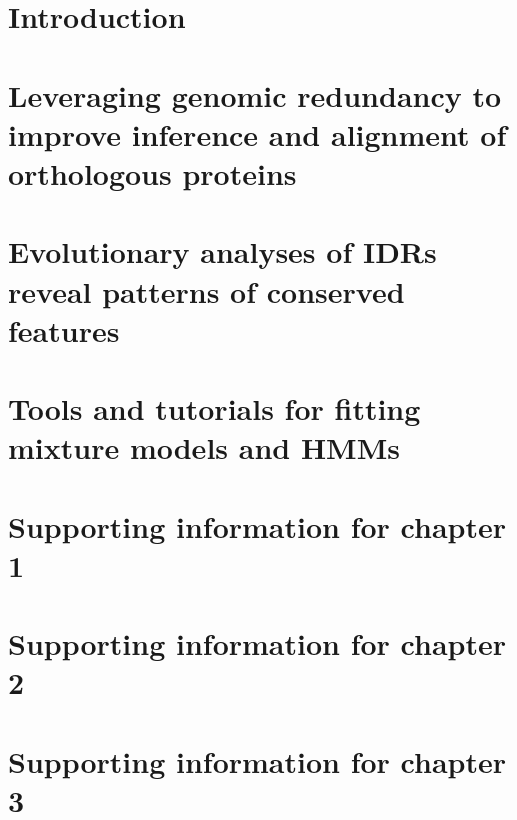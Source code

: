 \documentclass[11pt,letterpaper,oneside]{book}
\renewcommand{\thefigure}{\thechapter.\arabic{figure}}
\newlength{\promptwidth}
\begin{document}
\chapter{Introduction}
\label{chapter:0}
\graphicspath{{chapter0/figures/}}


\chapter{Leveraging genomic redundancy to improve inference and alignment of orthologous proteins}
\label{chapter:1}
\graphicspath{{chapter1/figures/}}


\chapter{Evolutionary analyses of IDRs reveal patterns of conserved features}
\label{chapter:2}
\graphicspath{{chapter2/figures/}}


\chapter{Tools and tutorials for fitting mixture models and HMMs}
\label{chapter:3}
\graphicspath{{chapter3/}}



\printbibliography[heading=bibintoc, title=References]  %

\appendix
\setcounter{figure}{0}
\renewcommand{\thefigure}{\thechapter\arabic{figure}}
\setcounter{table}{0}
\renewcommand{\thetable}{\thechapter\arabic{table}}

\chapter{Supporting information for chapter 1}
\label{appendix:a}
\graphicspath{{chapter1/figures/}}


\chapter{Supporting information for chapter 2}
\label{appendix:b}
\graphicspath{{chapter2/figures/}}


\chapter{Supporting information for chapter 3}
\label{appendix:c}
\setlength{\promptwidth}{0in}  %

\end{document}
